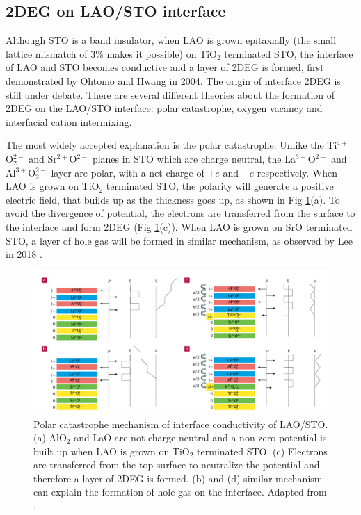 \documentclass[pdflatex, sectionletters, 12pt]{pittetd}    %
\begin{document}
\subsection{2DEG on LAO/STO interface}

Although STO is a band insulator, when LAO is grown epitaxially (the small lattice mismatch of 3\% makes it possible) on TiO$_2$ terminated STO, the interface of LAO and STO becomes conductive and a layer of 2DEG is formed, first demonstrated by Ohtomo and Hwang in 2004\cite{ohtomo2004high}. The origin of interface 2DEG is still under debate. There are several different theories about the formation of 2DEG on the LAO/STO interface: polar catastrophe\cite{nakagawa2006some}, oxygen vacancy\cite{kalabukhov2007effect} and interfacial cation intermixing\cite{willmott2007structural}. 

The most widely accepted explanation is the polar catastrophe. Unlike the Ti$^{4+}$O$_2^{2-}$ and Sr$^{2+}$O$^{2-}$ planes in STO which are charge neutral, the La$^{3+}$O$^{2-}$ and Al$^{3+}$O$_2^{2-}$ layer are polar, with a net charge of $+e$ and $-e$ respectively. When LAO is grown on TiO$_2$ terminated STO, the polarity will generate a positive electric field, that builds up as the thickness goes up, as shown in Fig \ref{FIG:PolarCatastrophe}(a). To avoid the divergence of potential, the electrons are transferred from the surface to the interface and form 2DEG (Fig \ref{FIG:PolarCatastrophe}(c)). When LAO is grown on SrO terminated STO, a layer of hole gas will be formed in similar mechanism, as observed by Lee in 2018 \cite{lee2018direct}.
\\

\begin{figure}[h!]
	\centering
	\includegraphics[width=1.0\textwidth]{Drawing/PolarCatastrophe.pdf}
	\caption{Polar catastrophe mechanism of interface conductivity of LAO/STO. (a) AlO$_2$ and LaO are not charge neutral and a non-zero potential is built up when LAO is grown on TiO$_2$ terminated STO. (c) Electrons are transferred from the top surface to neutralize the potential and therefore a layer of 2DEG is formed. (b) and (d) similar mechanism can explain the formation of hole gas on the interface. Adapted from \cite{nakagawa2006some}.}
	\label{FIG:PolarCatastrophe}
\end{figure}
\end{document}
